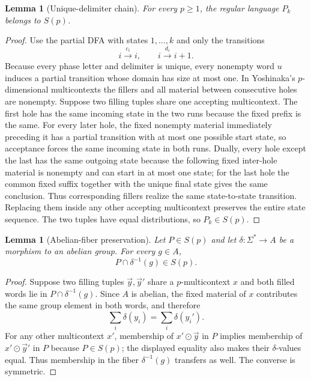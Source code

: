 \documentclass[11pt,a4paper]{article}
\numberwithin{equation}{section}
\theoremstyle{plain}
\newtheorem{lemma}[theorem]{Lemma}
\theoremstyle{definition}
\theoremstyle{remark}
\newcommand{\tuple}[1]{\vec{#1}}
\begin{document}
\begin{lemma}[Unique-delimiter chain]
\label{lem:unique-delimiter-chain}
For every $p\ge1$, the regular language $P_k$ belongs to $S(p)$.
\end{lemma}

\begin{proof}
Use the partial DFA with states $1,\ldots,k$ and only the transitions
\[
  i\xrightarrow{c_i}i,
  \qquad
  i\xrightarrow{d_i}i+1.
\]
Because every phase letter and delimiter is unique, every nonempty word $u$
induces a partial transition whose domain has size at most one.  In
Yoshinaka's $p$-dimensional multicontexts the fillers and all material between
consecutive holes are nonempty.  Suppose two filling tuples share one
accepting multicontext.  The first hole has the same incoming state in the two
runs because the fixed prefix is the same.  For every later hole, the fixed
nonempty material immediately preceding it has a partial transition with at
most one possible start state, so acceptance forces the same incoming state
in both runs.  Dually, every hole except the last has the same outgoing state
because the following fixed inter-hole material is nonempty and can start in
at most one state; for the last hole the common fixed suffix together with the
unique final state gives the same conclusion.  Thus corresponding fillers
realize the same state-to-state transition.  Replacing them inside any other
accepting multicontext preserves the entire state sequence.  The two tuples
have equal distributions, so $P_k\in S(p)$.
\end{proof}

\begin{lemma}[Abelian-fiber preservation]
\label{lem:abelian-fiber-preservation}
Let $P\in S(p)$ and let $\delta:\Sigma^*\to A$ be a morphism to an abelian
group.  For every $g\in A$,
\[
  P\cap\delta^{-1}(g)\in S(p).
\]
\end{lemma}

\begin{proof}
Suppose two filling tuples $\tuple y,\tuple y'$ share a $p$-multicontext $x$
and both filled words lie in $P\cap\delta^{-1}(g)$.  Since $A$ is abelian,
the fixed material of $x$ contributes the same group element in both words,
and therefore
\[
  \sum_i\delta(y_i)=\sum_i\delta(y_i').
\]
For any other multicontext $x'$, membership of $x'\odot\tuple y$ in $P$
implies membership of $x'\odot\tuple y'$ in $P$ because $P\in S(p)$; the
displayed equality also makes their $\delta$-values equal.  Thus membership in
the fiber $\delta^{-1}(g)$ transfers as well.  The converse is symmetric.
\end{proof}
\end{document}
